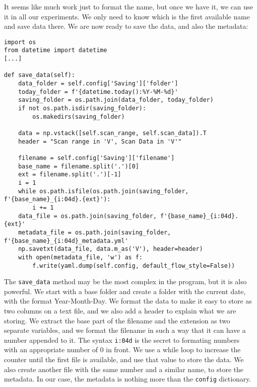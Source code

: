 It seems like much work just to format the name, but once we have it, we can use it in all our experiments. We only need to know which is the first available name and save data there. We are now ready to save the data, and also the metadata:

\begin{verbatim}
import os
from datetime import datetime
[...]

def save_data(self):
    data_folder = self.config['Saving']['folder']
    today_folder = f'{datetime.today():%Y-%M-%d}'
    saving_folder = os.path.join(data_folder, today_folder)
    if not os.path.isdir(saving_folder):
        os.makedirs(saving_folder)

    data = np.vstack([self.scan_range, self.scan_data]).T
    header = "Scan range in 'V', Scan Data in 'V'"

    filename = self.config['Saving']['filename']
    base_name = filename.split('.')[0]
    ext = filename.split('.')[-1]
    i = 1
    while os.path.isfile(os.path.join(saving_folder, f'{base_name}_{i:04d}.{ext}'):
        i += 1
    data_file = os.path.join(saving_folder, f'{base_name}_{i:04d}.{ext}'
    metadata_file = os.path.join(saving_folder, f'{base_name}_{i:04d}_metadata.yml'
    np.savetxt(data_file, data.m_as('V'), header=header)
    with open(metadata_file, 'w') as f:
        f.write(yaml.dump(self.config, default_flow_style=False))
\end{verbatim}

The \texttt{save\_data} method may be the most complex in the program, but it is also powerful. We start with a base folder and create a folder with the current date, with the format Year-Month-Day. We format the data to make it easy to store as two columns on a text file, and we also add a header to explain what we are storing. We extract the base part of the filename and the extension as two separate variables, and we format the filename in such a way that it can have a number appended to it. The syntax \texttt{i:04d} is the secret to formating numbers with an appropriate number of $0$ in front. We use a while loop to increase the counter until the first file is available, and use that value to store the data. We also create another file with the same number and a similar name, to store the metadata. In our case, the metadata is nothing more than the \texttt{config} dictionary.


